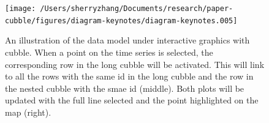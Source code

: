 \documentclass[
]{jss}
\begin{document}
\begin{CodeChunk}
\begin{figure}

{\centering \texttt{[image: /Users/sherryzhang/Documents/research/paper-cubble/figures/diagram-keynotes/diagram-keynotes.005]} 

}

\caption[An illustration of the data model under interactive graphics with cubble]{An illustration of the data model under interactive graphics with cubble. When a point on the time series is selected, the corresponding row in the long cubble will be activated. This will link to all the rows with the same id in the long cubble and the row in the nested cubble with the smae id (middle). Both plots will be updated with the full line selected and the point highlighted on the map (right).}\label{fig:illu-interactive-2}
\end{figure}
\end{CodeChunk}

\newpage


\end{document}

